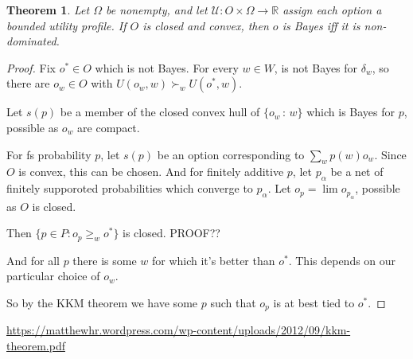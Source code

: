 \documentclass[11pt]{article}
\newtheorem{theorem}{Theorem}[section]
\theoremstyle{definition}
\theoremstyle{remark}
\newcommand{\U}{\mathcal U}
\newcommand{\given}{\,:\,}
\begin{document}
\begin{theorem}
Let $\Omega$ be nonempty, and let
$\U\colon O\times\Omega\to\mathbb R$
assign each option a bounded utility profile.
If $O$ is closed and convex, then $o$ is Bayes iff it is non-dominated.
\end{theorem}
\begin{proof}
	Fix $o^*\in O$ which is not Bayes. For every $w\in W$, is not Bayes for $\delta_w$, so there are $o_w\in O$ with $U(o_w,w)\succ_w U(o^*,w)$. 
	
	Let $s(p)$ be a member of the closed convex hull of $\{o_w\given w\}$ which is Bayes for $p$, possible as $o_w$ are compact. 
	
	For fs probability $p$, let $s(p)$ be an option corresponding to $\sum_w p(w) o_w$. Since $O$ is convex, this can be chosen. And for finitely additive $p$, let $p_\alpha$ be a net of finitely supporoted probabilities which converge to $p_\alpha$. Let $o_p=\lim o_{p_\alpha}$, possible as $O$ is closed. 
	
	Then $\{p\in P: o_p\geq_w o^*\}$ is closed. PROOF??
	
	And for all $p$ there is some $w$ for which it's better than $o^*$. This depends on our particular choice of $o_w$. 
	
	So by the KKM theorem we have some $p$ such that $o_p$ is at best tied to $o^*$. 

\end{proof}
\url{https://matthewhr.wordpress.com/wp-content/uploads/2012/09/kkm-theorem.pdf}
\end{document}
